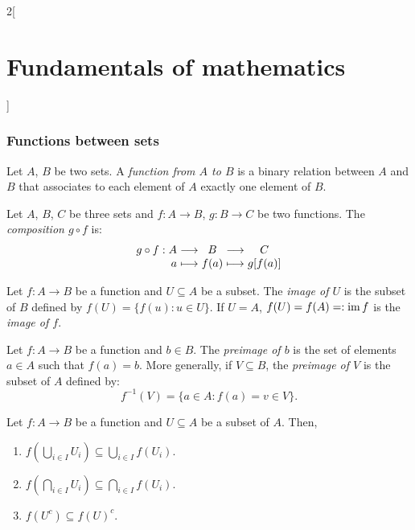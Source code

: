 \documentclass[../../../main.tex]{subfiles}
\begin{document}
\begin{multicols}{2}[\section{Fundamentals of mathematics}]
    \subsubsection*{Functions between sets}
    \begin{definition}
        Let $A$, $B$ be two sets. A \textit{function from $A$ to $B$} is a binary relation between $A$ and $B$ that associates to each element of $A$ exactly one element of $B$.
    \end{definition}
    \begin{definition}
        Let $A$, $B$, $C$ be three sets and $f:A\rightarrow B$, $g:B\rightarrow C$ be two functions. The \textit{composition $g\circ f$} is:
        $$\begin{array}{r@{\hspace{0.5\tabcolsep}}c@{\hspace{0.5\tabcolsep}}c@{\hspace{0.5\tabcolsep}}c@{\hspace{0.5\tabcolsep}}c}
                g\circ f:A & \longrightarrow & B    & \longrightarrow & C       \\
                a          & \longmapsto     & f(a) & \longmapsto     & g[f(a)]
            \end{array}$$
    \end{definition}
    \begin{definition}
        Let $f:A\rightarrow B$ be a function and $U\subseteq A$ be a subset. The \textit{image of $U$} is the subset of $B$ defined by $f(U)=\{f(u): u\in U\}$. If $U=A$, $f(U)=f(A)=:\operatorname{im} f$ is the \textit{image of $f$}.
    \end{definition}
    \begin{definition}
        Let $f:A\rightarrow B$ be a function and $b\in B$. The \textit{preimage of $b$} is the set of elements $a\in A$ such that $f(a)=b$. More generally, if $V\subseteq B$, the \textit{preimage of $V$} is the subset of $A$ defined by: $$f^{-1}(V)=\{a\in A: f(a)=v\in V\}.$$
    \end{definition}
    \begin{prop}
        Let $f:A\rightarrow B$ be a function and $U\subseteq A$ be a subset of $A$. Then,
        \begin{enumerate}
            \item $f\left(\bigcup_{i\in I}U_i\right)\subseteq\bigcup_{i\in I}f(U_i)$.
            \item $f\left(\bigcap_{i\in I}U_i\right)\subseteq\bigcap_{i\in I}f(U_i)$.
            \item $f(U^c)\subseteq f(U)^c$.

\end{enumerate}
\end{prop}
\end{multicols}
\end{document}
